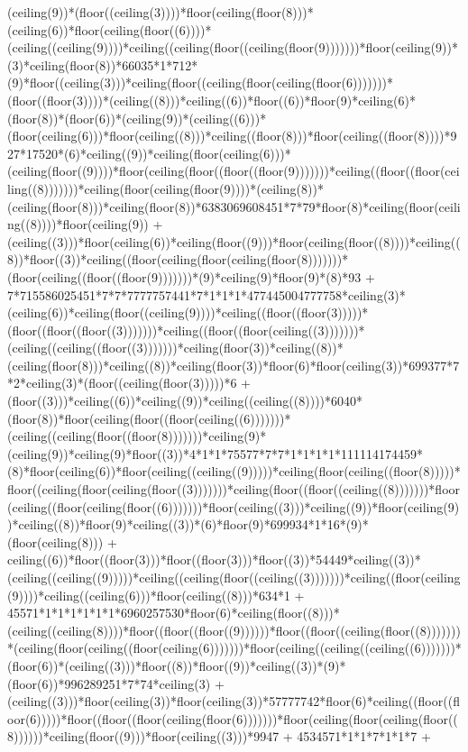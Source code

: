 (ceiling(9))*(floor((ceiling(3))))*floor(ceiling(floor(8)))*(ceiling(6))*floor(ceiling(floor((6))))*(ceiling((ceiling(9))))*ceiling((ceiling(floor((ceiling(floor(9)))))))*floor(ceiling(9))*(3)*ceiling(floor(8))*66035*1*712*(9)*floor((ceiling(3)))*ceiling(floor((ceiling(floor(ceiling(floor(6)))))))*(floor((floor(3))))*(ceiling((8)))*ceiling((6))*floor((6))*floor(9)*ceiling(6)*(floor(8))*(floor(6))*(ceiling(9))*(ceiling((6)))*(floor(ceiling(6)))*floor(ceiling((8)))*ceiling((floor(8)))*floor(ceiling((floor(8))))*927*17520*(6)*ceiling((9))*ceiling(floor(ceiling(6)))*(ceiling(floor((9))))*floor(ceiling(floor((floor((floor(9)))))))*ceiling((floor((floor(ceiling((8)))))))*ceiling(floor(ceiling(floor(9))))*(ceiling(8))*(ceiling(floor(8)))*ceiling(floor(8))*6383069608451*7*79*floor(8)*ceiling(floor(ceiling((8))))*floor(ceiling(9)) + (ceiling((3)))*floor(ceiling(6))*ceiling(floor((9)))*floor(ceiling(floor((8))))*ceiling((8))*floor((3))*ceiling((floor(ceiling(floor(ceiling(floor(8)))))))*(floor(ceiling((floor((floor(9)))))))*(9)*ceiling(9)*floor(9)*(8)*93 + 7*715586025451*7*7*7777757441*7*1*1*1*477445004777758*ceiling(3)*(ceiling(6))*ceiling(floor((ceiling(9))))*ceiling((floor((floor(3)))))*(floor((floor((floor((3)))))))*ceiling((floor((floor(ceiling((3)))))))*(ceiling((ceiling((floor((3)))))))*ceiling(floor(3))*ceiling((8))*(ceiling(floor(8)))*ceiling((8))*ceiling(floor(3))*floor(6)*floor(ceiling(3))*699377*7*2*ceiling(3)*(floor((ceiling(floor(3)))))*6 + (floor((3)))*ceiling((6))*ceiling((9))*ceiling((ceiling((8))))*6040*(floor(8))*floor(ceiling(floor((floor(ceiling((6)))))))*(ceiling((ceiling(floor((floor(8)))))))*ceiling(9)*(ceiling(9))*ceiling(9)*floor((3))*4*1*1*75577*7*7*1*1*1*1*111114174459*(8)*floor(ceiling(6))*floor(ceiling((ceiling((9)))))*ceiling(floor(ceiling((floor(8)))))*floor((ceiling(floor(ceiling(floor((3)))))))*ceiling(floor((floor((ceiling((8)))))))*floor(ceiling((floor(ceiling(floor((6)))))))*floor(ceiling((3)))*ceiling((9))*floor(ceiling(9))*ceiling((8))*floor(9)*ceiling((3))*(6)*floor(9)*699934*1*16*(9)*(floor(ceiling(8))) + ceiling((6))*floor((floor(3)))*floor((floor(3)))*floor((3))*54449*ceiling((3))*(ceiling((ceiling((9)))))*ceiling((ceiling(floor((ceiling((3)))))))*ceiling((floor(ceiling(9))))*ceiling((ceiling(6)))*floor(ceiling((8)))*634*1 + 45571*1*1*1*1*1*1*6960257530*floor(6)*ceiling(floor((8)))*(ceiling((ceiling(8))))*floor((floor((floor((9))))))*floor((floor((ceiling(floor((8)))))))*(ceiling(floor(ceiling((floor(ceiling(6)))))))*floor(ceiling((ceiling((ceiling((6)))))))*(floor(6))*(ceiling((3)))*floor((8))*floor((9))*ceiling((3))*(9)*(floor(6))*996289251*7*74*ceiling(3) + (ceiling((3)))*floor(ceiling(3))*floor(ceiling(3))*57777742*floor(6)*ceiling((floor((floor(6)))))*floor((floor((floor(ceiling(floor(6)))))))*floor(ceiling(floor(ceiling(floor((8))))))*ceiling(floor((9)))*floor(ceiling((3)))*9947 + 4534571*1*1*7*1*1*7 + 
